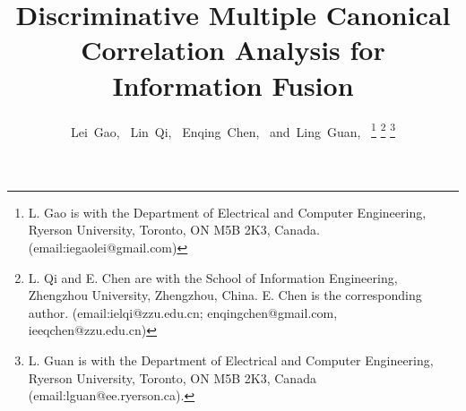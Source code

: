 \documentclass[journal]{IEEEtran}
\begin{document}
%
\title{Discriminative Multiple Canonical Correlation Analysis for Information Fusion}
%
%
\author{Lei~Gao,~
        Lin~Qi,~%
        Enqing~Chen,~
        and~Ling~Guan,~%
\thanks{L. Gao is with the Department of Electrical and Computer Engineering, Ryerson University, Toronto, ON M5B 2K3, Canada. (email:iegaolei@gmail.com)}
\thanks{L. Qi and E. Chen are with the School of Information Engineering, Zhengzhou University, Zhengzhou, China. E. Chen is the corresponding author. (email:ielqi@zzu.edu.cn; enqingchen@gmail.com, ieeqchen@zzu.edu.cn)}
\thanks{L. Guan is with the Department of Electrical and Computer Engineering, Ryerson University, Toronto, ON M5B 2K3, Canada (email:lguan@ee.ryerson.ca).}}

%
%
%
%
\end{document}
